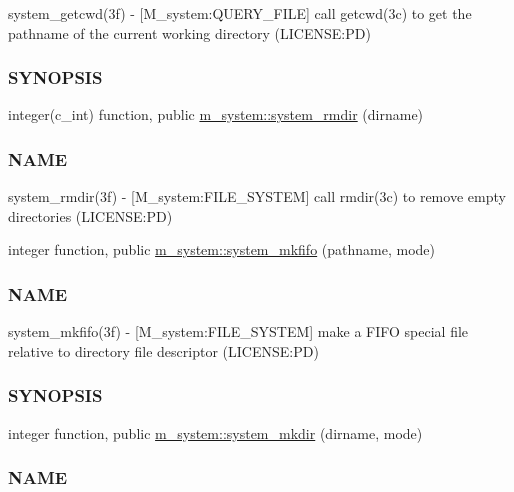 \begin{DoxyCompactItemize}
\begin{DoxyCompactList}
system\+\_\+getcwd(3f) -\/ \mbox{[}M\+\_\+system\+:Q\+U\+E\+R\+Y\+\_\+\+F\+I\+LE\mbox{]} call getcwd(3c) to get the pathname of the current working directory (L\+I\+C\+E\+N\+SE\+:PD) \subsubsection*{S\+Y\+N\+O\+P\+S\+IS}\end{DoxyCompactList}\item 
integer(c\+\_\+int) function, public \mbox{\hyperlink{namespacem__system_a21fd3e1ccd50cef6adc539ef3d7a9836}{m\+\_\+system\+::system\+\_\+rmdir}} (dirname)
\begin{DoxyCompactList}\small\item\em \subsubsection*{N\+A\+ME}

system\+\_\+rmdir(3f) -\/ \mbox{[}M\+\_\+system\+:F\+I\+L\+E\+\_\+\+S\+Y\+S\+T\+EM\mbox{]} call rmdir(3c) to remove empty directories (L\+I\+C\+E\+N\+SE\+:PD) \end{DoxyCompactList}\item 
integer function, public \mbox{\hyperlink{namespacem__system_ab2d95258ee26b85a0283538880775475}{m\+\_\+system\+::system\+\_\+mkfifo}} (pathname, mode)
\begin{DoxyCompactList}\small\item\em \subsubsection*{N\+A\+ME}

system\+\_\+mkfifo(3f) -\/ \mbox{[}M\+\_\+system\+:F\+I\+L\+E\+\_\+\+S\+Y\+S\+T\+EM\mbox{]} make a F\+I\+FO special file relative to directory file descriptor (L\+I\+C\+E\+N\+SE\+:PD) \subsubsection*{S\+Y\+N\+O\+P\+S\+IS}\end{DoxyCompactList}\item 
integer function, public \mbox{\hyperlink{namespacem__system_a084d644c236d22af2cc75c6e48fd6e96}{m\+\_\+system\+::system\+\_\+mkdir}} (dirname, mode)
\begin{DoxyCompactList}\small\item\em \subsubsection*{N\+A\+ME}


\end{DoxyCompactList}
\end{DoxyCompactItemize}
